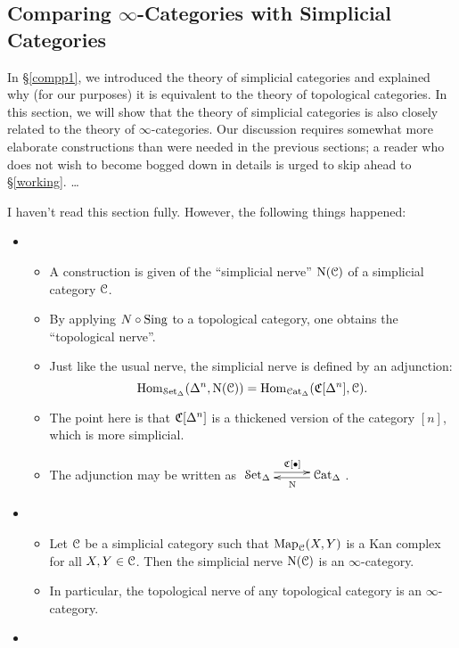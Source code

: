 \subsection{Comparing $\infty$-Categories with Simplicial Categories}\label{theequiv}

In \S \ref{compp1}, we introduced the theory of simplicial categories and explained why (for our purposes) it is equivalent to the theory of topological categories. In this section, we will show that the theory of simplicial categories is also closely related to the theory of $\infty$-categories.
Our discussion requires somewhat more elaborate constructions than were needed in the previous sections; a reader who does not wish to become bogged down in details is urged to skip ahead to \S \ref{working}. \ldots
\begin{shaded}
I haven't read this section fully. However, the following things happened:
\begin{itemize}\squishlist
\item 
\begin{itemize}\squishlist
\item A construction is given of the ``simplicial nerve'' $\operatorname{N}(\operatorname{\mathcal{C}})$ of a simplicial category $\operatorname{\mathcal{C}}$.
\item By applying $N\circ\operatorname{Sing}$ to a topological category, one obtains the ``topological nerve''.
\item Just like the usual nerve, the simplicial nerve is defined by an adjunction:
\[\operatorname{Hom}_{ \operatorname{\mathcal{S}et_{\Delta}}}( \Delta^n, \operatorname{N}(\operatorname{\mathcal{C}})) =
\operatorname{Hom}_{\operatorname{\mathcal{C}at_{\Delta}}}( \operatorname{\mathfrak{C}}[ \Delta^n ], \operatorname{\mathcal{C}}).\]
\item The point here is that $\operatorname{\mathfrak{C}}[ \Delta^n ]$ is a thickened version of the category $[n]$, which is more simplicial.
\item The adjunction may be written as
$\xymatrix@R=.3cm@C=1cm{
\sSet  \ar@<.6ex>[r]^{\sCoNerve[\bigdot]}&
\sCat  \ar@<.4ex>[l]^{\Nerve}
}$.
\end{itemize}
\item
\begin{itemize}\squishlist
\item Let $\operatorname{\mathcal{C}}$ be a simplicial category such that $\operatorname{{Map}}_{\operatorname{\mathcal{C}}}(X,Y)$ is a Kan complex for all $X,Y\in\operatorname{\mathcal{C}}$. Then the simplicial nerve $\operatorname{N}(\operatorname{\mathcal{C}})$ is an $\infty$-category.
\item In particular, the topological nerve of any topological category is an $\infty$-category.
\end{itemize}
\item
\begin{itemize}\squishlist

\end{itemize}
\end{itemize}
\end{shaded}
